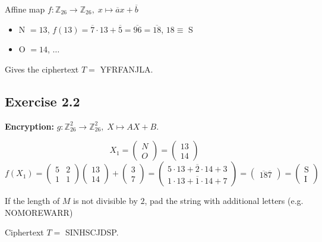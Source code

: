 \documentclass[a4paper]{scrreprt}
\begin{document}
Affine map $f: \mathbb Z_{26}\rightarrow\mathbb Z_{26},\; x\mapsto\overline ax+\overline b$

\begin{itemize}
    \item N $=13$, $f(13) = \overline 7\cdot 13+\overline 5=\overline {96} = \overline{18}$, $18 \equiv $ S
    \item O $=14$, $\hdots$
\end{itemize}

Gives the ciphertext $T=$ YFRFANJLA.

\subsection*{Exercise 2.2}

\textbf{Encryption:} $g:\mathbb Z_{26}^2\rightarrow\mathbb Z_{26}^2,\; X\mapsto AX+B$.

\[X_1 = \begin{pmatrix}N\\O\end{pmatrix}=\begin{pmatrix}13\\14\end{pmatrix}\]
    \[f(X_1)=\begin{pmatrix}5&2\\1&1\end{pmatrix}\begin{pmatrix}13\\14\end{pmatrix}
        + \begin{pmatrix}3\\7\end{pmatrix}
            = \begin{pmatrix}\overline{5\cdot 13+2\cdot 14+3}\\\overline{1\cdot 13+1\cdot 14+7}\end{pmatrix}
                = \begin{pmatrix}\overline{18}\overline 7\end{pmatrix}
                    = \begin{pmatrix}\mathrm S\\\mathrm I\end{pmatrix}\]

If the length of $M$ is not divisible by $2$, pad the string with additional letters (e.g. NOMOREWARR)

Ciphertext $T=$ SINHSCJDSP.
\vspace{1em}
\end{document}
